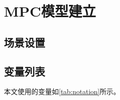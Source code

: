 \documentclass[12pt,hyperref,a4paper,UTF8]{ctexart}
\begin{document}

%
%

\thispagestyle{empty} %

\newpage
\tableofcontents

\newpage


\section{MPC模型建立}

\subsection{场景设置}


\subsection{变量列表}

本文使用的变量如\autoref{tab:notation}所示。

\end{document}
